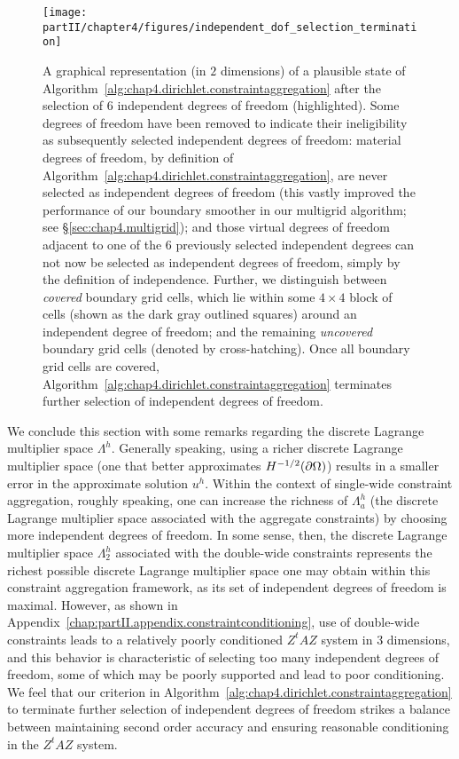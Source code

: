 \setlength{\figurewidth}{0.50\textwidth}
\begin{figure}[htb]
\centering
\texttt{[image: partII/chapter4/figures/independent\_dof\_selection\_termination]}
\caption{A graphical representation (in $2$ dimensions) of a plausible state of Algorithm~\ref{alg:chap4.dirichlet.constraintaggregation} after the selection of $6$ independent degrees of freedom (highlighted). Some degrees of freedom have been removed to indicate their ineligibility as subsequently selected independent degrees of freedom: material degrees of freedom, by definition of Algorithm~\ref{alg:chap4.dirichlet.constraintaggregation}, are never selected as independent degrees of freedom (this vastly improved the performance of our boundary smoother in our multigrid algorithm; see \S\ref{sec:chap4.multigrid}); and those virtual degrees of freedom adjacent to one of the $6$ previously selected independent degrees can not now be selected as independent degrees of freedom, simply by the definition of independence. Further, we distinguish between \emph{covered} boundary grid cells, which lie within some $4 \times 4$ block of cells (shown as the dark gray outlined squares) around an independent degree of freedom; and the remaining \emph{uncovered} boundary grid cells (denoted by cross-hatching). Once all boundary grid cells are covered, Algorithm~\ref{alg:chap4.dirichlet.constraintaggregation} terminates further selection of independent degrees of freedom.}
\label{fig:chap4.indydoftermination}
\end{figure}

We conclude this section with some remarks regarding the discrete Lagrange multiplier space $\Lambda^h$. Generally speaking, using a richer discrete Lagrange multiplier space (one that better approximates $H^{-1/2}(\partial\Omega)$) results in a smaller error in the approximate solution $u^h$. Within the context of single-wide constraint aggregation, roughly speaking, one can increase the richness of $\Lambda^h_a$ (the discrete Lagrange multiplier space associated with the aggregate constraints) by choosing more independent degrees of freedom. In some sense, then, the discrete Lagrange multiplier space $\Lambda^h_2$ associated with the double-wide constraints represents the richest possible discrete Lagrange multiplier space one may obtain within this constraint aggregation framework, as its set of independent degrees of freedom is maximal. However, as shown in Appendix~\ref{chap:partII.appendix.constraintconditioning}, use of double-wide constraints leads to a relatively poorly conditioned $Z^tAZ$ system in $3$ dimensions, and this behavior is characteristic of selecting too many independent degrees of freedom, some of which may be poorly supported and lead to poor conditioning. We feel that our criterion in Algorithm~\ref{alg:chap4.dirichlet.constraintaggregation} to terminate further selection of independent degrees of freedom strikes a balance between maintaining second order accuracy and ensuring reasonable conditioning in the $Z^tAZ$ system.

